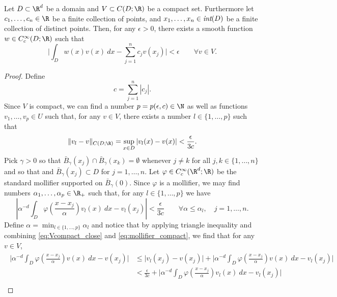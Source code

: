 {\begin{lemma}
\label{lemma:mollifier}
Let \(D \subset \R^d\) be a domain and \(V \subset C(D;\R)\) be a compact set. Furthermore let \(c_1,\dots,c_n \in \R\)
be a finite collection of points, and \(x_1,\dots,x_n \in \emph{\text{int}}(D)\) be a finite collection of distinct points. 
Then, for any \(\epsilon > 0\), there exists a smooth function \(w \in C^\infty_c (D;\R)\) such that
\[ \Big| \int_D w(x) v(x) \: dx - \sum_{j=1}^n c_j v(x_j) \Big| < \epsilon \qquad \forall v \in V. \] 
\end{lemma}
\begin{proof}
Define 
\[c = \sum_{j=1}^n |c_j|.\]
Since \(V\) is compact, we can find 
a number \(p = p(\epsilon,c) \in \N\) as well as functions \(v_1,\dots,v_p \in U\) such that,
for any \(v \in V\), there exists a number \(l \in \{1,\dots,p\}\) such that
\begin{equation}
\label{eq:Vcompact_close}
\|v_l - v\|_{C(D;\R)} = \sup_{x \in D} |v_l(x) - v(x)| < \frac{\epsilon}{3 c}.
\end{equation}
Pick \(\gamma > 0\)
so that \(\bar{B}_\gamma(x_j) \cap \bar{B}_\gamma(x_k) = \emptyset\) whenever \(j \neq k\) for all \(j,k \in \{1,\dots,n\}\) and so that 
and \(\bar{B}_\gamma(x_j) \subset D\) for \(j=1,\dots,n\). 
Let \(\varphi \in C^\infty_c (\R^d;\R)\) be the standard mollifier supported on \(\bar{B}_\gamma(0)\). Since \(\varphi\) is a mollifier,
we may find numbers \(\alpha_1,\dots,\alpha_p \in \R_+\) such that, for any \(l \in \{1,\dots,p\}\) we have
\begin{equation}
\label{eq:mollifier_compact}
|\alpha^{-d} \int_D \varphi \left ( \frac{x - x_j}{\alpha} \right ) v_l(x) \: dx - v_l(x_j) | < \frac{\epsilon}{3c} \qquad \forall \alpha \leq \alpha_l, \quad j=1,\dots,n.
\end{equation}
Define \(\alpha = \min_{l \in \{1,\dots,p\}} \alpha_l\) and notice that by applying triangle inequality and 
combining \eqref{eq:Vcompact_close} and \eqref{eq:mollifier_compact}, we find that for any \(v \in V\),
\begin{align}
\label{eq:mollifier_alpha}
\begin{split}
\Big|\alpha^{-d} \int_D \varphi \left ( \frac{x-x_j}{\alpha} \right )v(x) \: dx - v(x_j)\Big| &\leq \Big|v_l(x_j) - v(x_j)\Big| + \Big|\alpha^{-d} \int_D \varphi \left ( \frac{x-x_j}{\alpha} \right ) v(x) \: dx - v_l(x_j)\Big| \\
&< \frac{\epsilon}{3c} + \Big|\alpha^{-d} \int_D \varphi \left ( \frac{x-x_j}{\alpha} \right ) v_l(x) \: dx - v_l(x_j)\Big| \\

\end{split}
\end{align}
\end{proof}}
